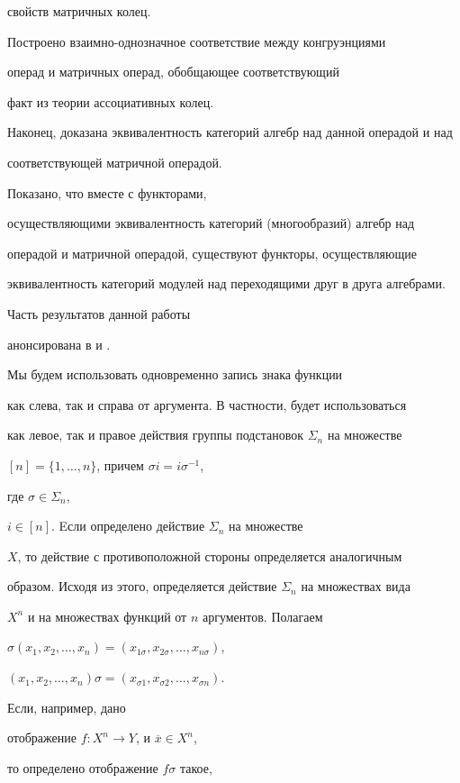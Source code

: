 свойств матричных колец.


Построено взаимно-однозначное соответствие между конгруэнциями


операд и матричных операд, обобщающее соответствующий


факт из теории ассоциативных колец.


Наконец, доказана эквивалентность категорий алгебр над данной операдой и над


соответствующей матричной операдой.


Показано, что вместе с функторами,


осуществляющими эквивалентность категорий (многообразий) алгебр над


операдой и матричной операдой, существуют функторы, осуществляющие


эквивалентность категорий модулей над переходящими друг в друга алгебрами.


Часть результатов данной работы


анонсирована в \cite{TK1} и \cite{K1}.





Мы будем использовать одновременно запись знака функции


как слева, так и справа от аргумента. В частности, будет использоваться


как левое, так и правое действия группы подстановок $\Sigma_n$ на множестве


$[n]=\{1, \dotsc, n\}$, причем $\sigma i= i \sigma^{-1}$,


где $\sigma\in \Sigma_n$,


$i\in [n]$. Eсли определено действие $\Sigma_n$ на множестве


$X$, то действие с противоположной стороны определяется аналогичным


образом. Исходя из этого, определяется действие $\Sigma_n$ на множествах вида


$X^n$ и на множествах функций от $n$ аргументов. Полагаем


$\sigma(x_1,x_2,\dotsc, x_n)=(x_{1\sigma},x_{2\sigma},\dotsc,x_{n\sigma})$,


$(x_1,x_2,\dotsc, x_n)\sigma=


(x_{\sigma 1},x_{\sigma 2},\dotsc, x_{\sigma n})$.


Если, например, дано


отображение $f : X^n \to Y$, и $\overline{x}\in X^n$,


то определено отображение $f\sigma$ такое,


